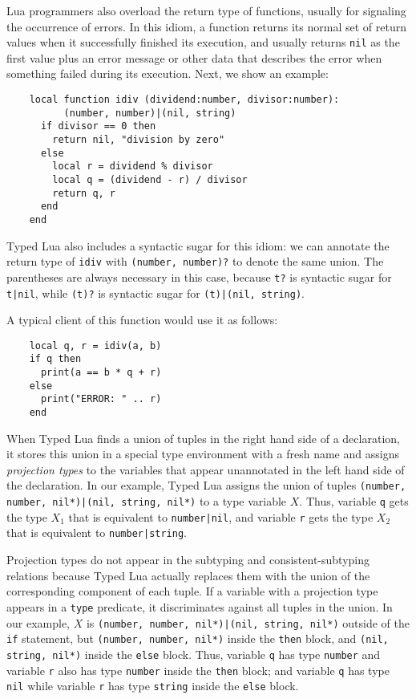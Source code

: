 Lua programmers also overload the return type of functions,
usually for signaling the occurrence of errors.
In this idiom, a function returns its normal set of return values
when it successfully finished its execution,
and usually returns \texttt{nil} as the first value plus an
error message or other data that describes the error
when something failed during its execution.
Next, we show an example:
\begin{verbatim}
    local function idiv (dividend:number, divisor:number):
          (number, number)|(nil, string)
      if divisor == 0 then
        return nil, "division by zero"
      else
        local r = dividend % divisor
        local q = (dividend - r) / divisor
        return q, r
      end 
    end
\end{verbatim}

Typed Lua also includes a syntactic sugar for this idiom:
we can annotate the return type of \texttt{idiv} with
\texttt{(number, number)?} to denote the same union.
The parentheses are always necessary in this case, because
\texttt{t?} is syntactic sugar for \texttt{t|nil},
while \texttt{(t)?} is syntactic sugar for \texttt{(t)|(nil, string)}.

A typical client of this function would use it as follows:
\begin{verbatim}
    local q, r = idiv(a, b)
    if q then
      print(a == b * q + r)
    else
      print("ERROR: " .. r)
    end
\end{verbatim}

When Typed Lua finds a union of tuples in the right hand side of
a declaration, it stores this union in a special type environment
with a fresh name and assigns \emph{projection types} to the
variables that appear unannotated in the left hand side of the declaration.
In our example, Typed Lua assigns the union of tuples
\texttt{(number, number, nil*)|(nil, string, nil*)} to a type variable $X$.
Thus, variable \texttt{q} gets the type $X_{1}$
that is equivalent to \texttt{number|nil},
and variable \texttt{r} gets the type $X_{2}$
that is equivalent to \texttt{number|string}.

Projection types do not appear in the subtyping and consistent-subtyping
relations because Typed Lua actually replaces them with the union of the
corresponding component of each tuple.
If a variable with a projection type appears in a \texttt{type} predicate,
it discriminates against all tuples in the union.
In our example, $X$ is \texttt{(number, number, nil*)|(nil, string, nil*)}
outside of the \texttt{if} statement,
but \texttt{(number, number, nil*)} inside the \texttt{then} block,
and \texttt{(nil, string, nil*)} inside the \texttt{else} block.
Thus, variable \texttt{q} has type \texttt{number} and variable \texttt{r} also
has type \texttt{number} inside the \texttt{then} block;
and variable \texttt{q} has type \texttt{nil} while variable \texttt{r}
has type \texttt{string} inside the \texttt{else} block.


